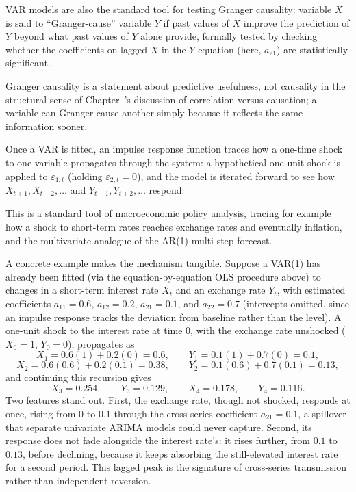 \documentclass[../ai_in_finance]{subfiles}
\begin{document}
VAR models are also the standard tool for testing Granger causality: variable $X$ is said to ``Granger-cause'' variable $Y$ if past values of $X$ improve the prediction of $Y$ beyond what past values of $Y$ alone provide, formally tested by checking whether the coefficients on lagged $X$ in the $Y$ equation (here, $a_{21}$) are statistically significant.

Granger causality is a statement about predictive usefulness, not causality in the structural sense of Chapter~'s discussion of correlation versus causation; a variable can Granger-cause another simply because it reflects the same information sooner.

Once a VAR is fitted, an impulse response function traces how a one-time shock to one variable propagates through the system: a hypothetical one-unit shock is applied to $\varepsilon_{1,t}$ (holding $\varepsilon_{2,t}=0$), and the model is iterated forward to see how $X_{t+1}, X_{t+2}, \ldots$ and $Y_{t+1}, Y_{t+2}, \ldots$ respond.

This is a standard tool of macroeconomic policy analysis, tracing for example how a shock to short-term rates reaches exchange rates and eventually inflation, and the multivariate analogue of the AR(1) multi-step forecast.

A concrete example makes the mechanism tangible. Suppose a VAR(1) has already been fitted (via the equation-by-equation OLS procedure above) to changes in a short-term interest rate $X_t$ and an exchange rate $Y_t$, with estimated coefficients $a_{11}=0.6$, $a_{12}=0.2$, $a_{21}=0.1$, and $a_{22}=0.7$ (intercepts omitted, since an impulse response tracks the deviation from baseline rather than the level). A one-unit shock to the interest rate at time $0$, with the exchange rate unshocked ($X_0=1$, $Y_0=0$), propagates as
\begin{equation*}
X_1 = 0.6(1) + 0.2(0) = 0.6, \qquad Y_1 = 0.1(1) + 0.7(0) = 0.1,
\end{equation*}
\begin{equation*}
X_2 = 0.6(0.6) + 0.2(0.1) = 0.38, \qquad Y_2 = 0.1(0.6) + 0.7(0.1) = 0.13,
\end{equation*}
and continuing this recursion gives
\begin{equation*}
X_3 = 0.254, \qquad Y_3 = 0.129, \qquad X_4 = 0.178, \qquad Y_4 = 0.116.
\end{equation*}
Two features stand out. First, the exchange rate, though not shocked, responds at once, rising from $0$ to $0.1$ through the cross-series coefficient $a_{21}=0.1$, a spillover that separate univariate ARIMA models could never capture.
Second, its response does not fade alongside the interest rate's: it rises further, from $0.1$ to $0.13$, before declining, because it keeps absorbing the still-elevated interest rate for a second period. This lagged peak is the signature of cross-series transmission rather than independent reversion.
\end{document}
